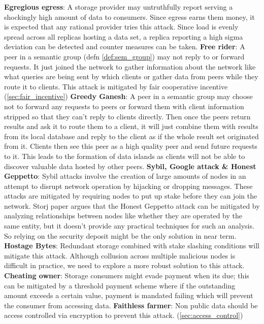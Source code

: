\newline\newline
\textbf{Egregious egress}: A storage provider may untruthfully report serving a shockingly high amount of data to consumers. Since egress earns them money, it is expected that any rational provider tries this attack. Since load is evenly spread across all replicas hosting a data set, a replica reporting a high sigma deviation can be detected and counter measures can be taken. 
\newline\newline
\textbf{Free rider}: A peer in a semantic group (defn \ref{def:sem_group}) may not reply to or forward requests. It just joined the network to gather information about the network like what queries are being sent by which clients or gather data from peers while they route it to clients. This attack is mitigated by fair cooperative incentive (\cref{sec:fair_incentive})
\newline\newline
\textbf{Greedy Ganesh}: A peer in a semantic group may choose not to forward any requests to peers or forward them with client information stripped so that they can't reply to clients directly. Then once the peers return results and ask it to route them to a client, it will just combine them with results from its local database and reply to the client as if the whole result set originated from it. Clients then see this peer as a high quality peer and send future requests to it. This leads to the formation of data islands as clients will not be able to discover valuable data hosted by other peers.
\newline\newline
\textbf{Sybil, Google attack \& Honest Geppetto}: Sybil attacks involve the creation of large amounts of nodes in an attempt to disrupt network operation by hijacking or dropping messages. These attacks are mitigated by requiring nodes to put up stake before they can join the network. Storj paper \cite{Storj} argues that the Honest Geppetto attack can be mitigated by analyzing relationships between nodes like whether they are operated by the same entity, but it doesn't provide any practical techniques for such an analysis. So relying on the security deposit might be the only solution in near term.
\newline\newline
\textbf{Hostage Bytes}: Redundant storage combined with stake slashing conditions will mitigate this attack. Although collusion across multiple malicious nodes is difficult in practice, we need to explore a more robust solution to this attack.
\newline\newline
\textbf{Cheating owner}: Storage consumers might evade payment when its due; this can be mitigated by a threshold payment scheme where if the outstanding amount exceeds a certain value, payment is mandated failing which will prevent the consumer from accessing data.
\newline\newline
\textbf{Faithless farmer}: Non public data should be access controlled via encryption to prevent this attack. (\cref{sec:access_control}) 